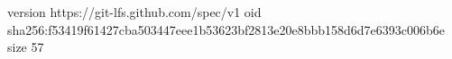 version https://git-lfs.github.com/spec/v1
oid sha256:f53419f61427cba503447eee1b53623bf2813e20e8bbb158d6d7e6393c006b6e
size 57
